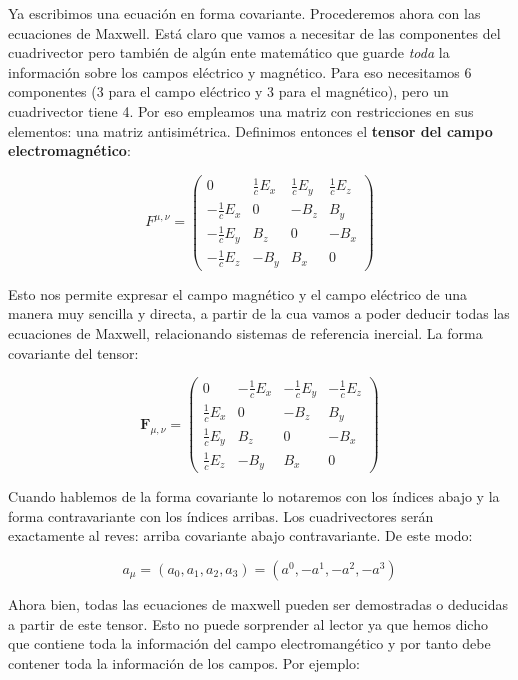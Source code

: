 \documentclass[12pt,a4paper]{article}
\newcommand{\Fn}{\mathbf{F}}
\numberwithin{equation}{section}
\numberwithin{figure}{section}
\begin{document}
Ya escribimos una ecuación en forma covariante. Procederemos ahora con las ecuaciones de Maxwell. Está claro que vamos a necesitar de las componentes del cuadrivector pero también de algún ente matemático que guarde \textit{toda} la información sobre los campos eléctrico y magnético. Para eso necesitamos 6 componentes (3 para el campo eléctrico y 3 para el magnético), pero un cuadrivector tiene 4. Por eso empleamos una matriz con restricciones en sus elementos: una matriz antisimétrica. Definimos entonces el \textbf{tensor del campo electromagnético}:

\begin{equation}
F^{\mu,\nu} = \begin{pmatrix}
0 & \frac{1}{c} E_x & \frac{1}{c} E_y & \frac{1}{c} E_z  \\ 
-\frac{1}{c} E_x & 0 & -B_z & B_y \\
-\frac{1}{c} E_y & B_z & 0 & - B_x \\
-\frac{1}{c} E_z & - B_y & B_x & 0
\end{pmatrix}
\end{equation}


Esto nos permite expresar el campo magnético y el campo eléctrico de una manera muy sencilla y directa, a partir de la cua vamos a poder deducir todas las ecuaciones de Maxwell, relacionando sistemas de referencia inercial. La forma covariante del tensor: 


\begin{equation}
\Fn_{\mu,\nu} = \begin{pmatrix}
0 & - \frac{1}{c} E_x &  - \frac{1}{c} E_y & - \frac{1}{c} E_z  \\ 
\frac{1}{c} E_x & 0 & -B_z & B_y \\
\frac{1}{c} E_y & B_z & 0 & - B_x \\
\frac{1}{c} E_z & - B_y & B_x & 0
\end{pmatrix}
\end{equation}

Cuando hablemos de la forma covariante lo notaremos con los índices abajo y la forma contravariante con los índices arribas. Los cuadrivectores serán exactamente al reves: arriba covariante abajo contravariante. De este modo:

\begin{equation}
a_\mu = (a_0,a_1,a_2,a_3)=(a^0, -a^1,-a^2,-a^3)
\end{equation}

Ahora bien, todas las ecuaciones de maxwell pueden ser demostradas o deducidas a partir de este tensor. Esto no puede sorprender al lector ya que hemos dicho que contiene toda la información del campo electromangético y por tanto debe contener toda la información de los campos. Por ejemplo:
\end{document}

